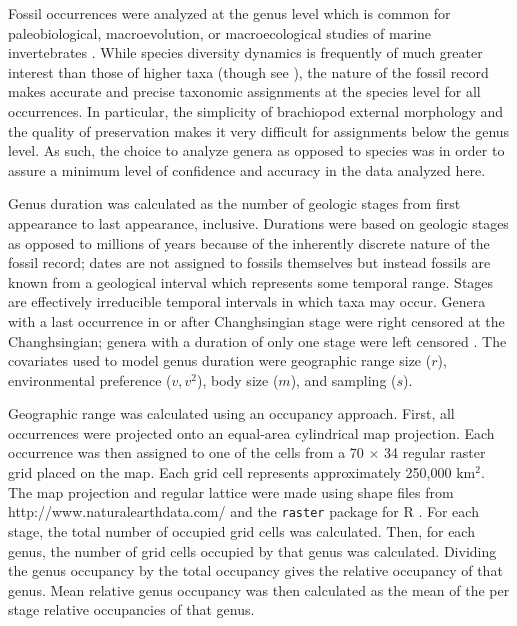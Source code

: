 \documentclass{article}
\begin{document}
Fossil occurrences were analyzed at the genus level which is common for paleobiological, macroevolution, or macroecological studies of marine invertebrates \citep{Alroy2010,Foote2013,Harnik2013,Kiessling2007a,Miller2009a,Nurnberg2013a,Nurnberg2015,Payne2007,Simpson2009,Vilhena2013}. While species diversity dynamics is frequently of much greater interest than those of higher taxa (though see \citealt{Foote2014b,Harnik2014a,Hoehn2015}), the nature of the fossil record makes accurate and precise taxonomic assignments at the species level for all occurrences. In particular, the simplicity of brachiopod external morphology and the quality of preservation makes it very difficult for assignments below the genus level. As such, the choice to analyze genera as opposed to species was in order to assure a minimum level of confidence and accuracy in the data analyzed here.

Genus duration was calculated as the number of geologic stages from first appearance to last appearance, inclusive. Durations were based on geologic stages as opposed to millions of years because of the inherently discrete nature of the fossil record; dates are not assigned to fossils themselves but instead fossils are known from a geological interval which represents some temporal range. Stages are effectively irreducible temporal intervals in which taxa may occur. Genera with a last occurrence in or after Changhsingian stage were right censored at the Changhsingian; genera with a duration of only one stage were left censored \citep{Klein2003}. The covariates used to model genus duration were geographic range size (\(r\)), environmental preference (\(v, v^{2}\)), body size (\(m\)), and sampling (\(s\)).

Geographic range was calculated using an occupancy approach. First, all occurrences were projected onto an equal-area cylindrical map projection. Each occurrence was then assigned to one of the cells from a 70 \(\times\) 34 regular raster grid placed on the map. Each grid cell represents approximately 250,000 km\(^{2}\). The map projection and regular lattice were made using shape files from http://www.naturalearthdata.com/ and the \texttt{raster} package for R \citep{raster}. For each stage, the total number of occupied grid cells was calculated. Then, for each genus, the number of grid cells occupied by that genus was calculated. Dividing the genus occupancy by the total occupancy gives the relative occupancy of that genus. Mean relative genus occupancy was then calculated as the mean of the per stage relative occupancies of that genus. 
\end{document}
